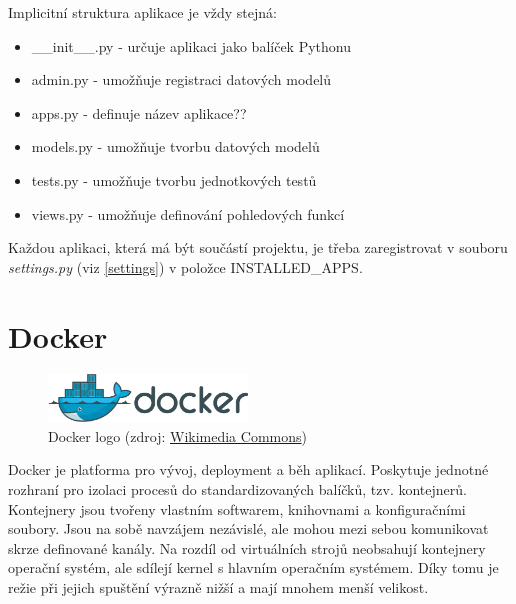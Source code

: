 Implicitní struktura aplikace je vždy stejná:

\begin{itemize}
\item \textsf{\_\_init\_\_.py} - určuje aplikaci jako balíček Pythonu
\item \textsf{admin.py} - umožňuje registraci datových modelů
\item \textsf{apps.py} - definuje název aplikace??
\item \textsf{models.py} - umožňuje tvorbu datových modelů
\item \textsf{tests.py} - umožňuje tvorbu jednotkových testů
\item \textsf{views.py} - umožňuje definování pohledových funkcí
\end{itemize}

Každou aplikaci, která má být součástí projektu, je třeba
zaregistrovat v souboru \textit{settings.py} (viz \ref{settings}) v
položce \textsf{INSTALLED\_APPS}.

\section{Docker}
\label{docker}

\begin{figure}[H] \centering
      \includegraphics[width=150pt]{./pictures/Docker_(container_engine)_logo.png}
      \caption[Docker logo]{Docker logo (zdroj:
\href{https://commons.wikimedia.org/wiki/File:Docker_(container_engine)_logo.png}{Wikimedia Commons})}
      \label{fig:docker}
  \end{figure}
  
Docker je platforma pro vývoj, deployment a běh aplikací. Poskytuje jednotné rozhraní pro izolaci procesů do standardizovaných balíčků, tzv. kontejnerů. Kontejnery jsou tvořeny vlastním softwarem, knihovnami a konfiguračními soubory. Jsou na sobě navzájem nezávislé, ale mohou mezi sebou komunikovat skrze definované kanály. Na rozdíl od virtuálních strojů neobsahují kontejnery operační systém, ale sdílejí kernel s hlavním operačním systémem. Díky tomu je režie při jejich spuštění výrazně nižší a mají mnohem menší velikost.


